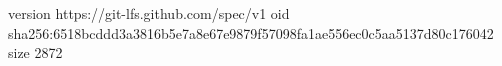 version https://git-lfs.github.com/spec/v1
oid sha256:6518bcddd3a3816b5e7a8e67e9879f57098fa1ae556ec0c5aa5137d80c176042
size 2872
